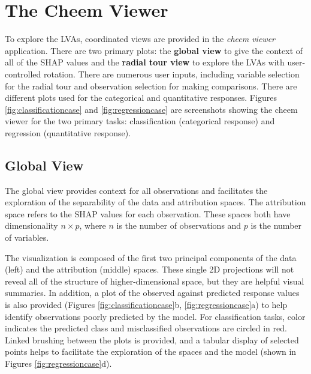 \documentclass[
]{sn-jnl}
\begin{document}
\hypertarget{sec:cheemviewer}{%
\section{The Cheem Viewer}\label{sec:cheemviewer}}

To explore the LVAs, coordinated views \citep{roberts_state_2007}
\citep[also known as ensemble graphics,][]{unwin_ensemble_2018} are
provided in the \emph{cheem viewer} application. There are two primary
plots: the \textbf{global view} to give the context of all of the SHAP
values and the \textbf{radial tour view} to explore the LVAs with
user-controlled rotation. There are numerous user inputs, including
variable selection for the radial tour and observation selection for
making comparisons. There are different plots used for the categorical
and quantitative responses. Figures \ref{fig:classificationcase} and
\ref{fig:regressioncase} are screenshots showing the cheem viewer for
the two primary tasks: classification (categorical response) and
regression (quantitative response).

\hypertarget{global-view}{%
\subsection{Global View}\label{global-view}}

The global view provides context for all observations and facilitates
the exploration of the separability of the data and attribution spaces.
The attribution space refers to the SHAP values for each observation.
These spaces both have dimensionality \(n \times p\), where \(n\) is the
number of observations and \(p\) is the number of variables.

The visualization is composed of the first two principal components of
the data (left) and the attribution (middle) spaces. These single 2D
projections will not reveal all of the structure of higher-dimensional
space, but they are helpful visual summaries. In addition, a plot of the
observed against predicted response values is also provided (Figures
\ref{fig:classificationcase}b, \ref{fig:regressioncase}a) to help
identify observations poorly predicted by the model. For classification
tasks, color indicates the predicted class and misclassified
observations are circled in red. Linked brushing between the plots is
provided, and a tabular display of selected points helps to facilitate
the exploration of the spaces and the model (shown in Figures
\ref{fig:regressioncase}d).
\end{document}
